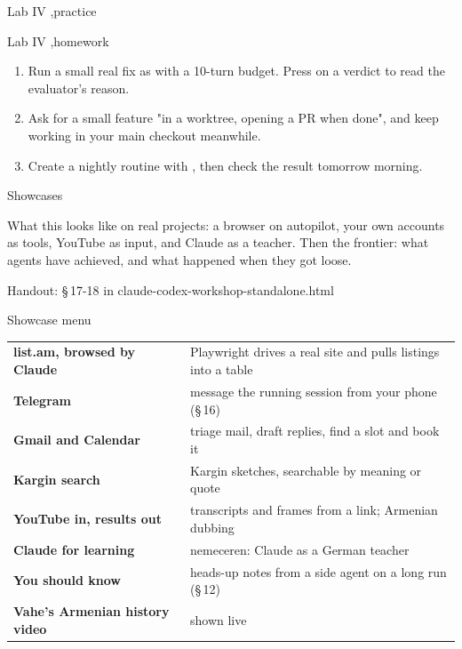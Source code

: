 \documentclass[aspectratio=169,11pt,t]{beamer}
\newcommand{\partframe}[4]{%
  \setsec{}%
  \begin{frame}[c]
    \lbl{Part #1}\par\vspace{0.5em}
    {\seriffamily\fontsize{40}{42}\selectfont #2}\par\vspace{0.8em}
    \begin{minipage}{0.8\textwidth}\raggedright\color{muted}#4\end{minipage}\par\vspace{1.4em}
    {\ttfamily\scriptsize\color{dim}Handout: \S\,#3 in claude-codex-workshop-standalone.html}
  \end{frame}}
\begin{document}
\setsec{}
\begin{frame}{Lab IV \sep practice}
  \begin{lab}{Lab IV \sep homework}
    \begin{enumerate}\setlength\itemsep{0.5em}
      \item Run a small real fix as  with a 10-turn budget. Press  on a verdict to read the evaluator's reason.
      \item Ask for a small feature "in a worktree, opening a PR when done", and keep working in your main checkout meanwhile.
      \item Create a nightly routine with , then check the result tomorrow morning.
    \end{enumerate}
  \end{lab}
\end{frame}

\partframe{V}{Showcases}{17-18}{What this looks like on real projects: a browser on autopilot, your own accounts as tools, YouTube as input, and Claude as a teacher. Then the frontier: what agents have achieved, and what happened when they got loose.}

\begin{frame}{Showcase menu}
  \footnotesize
  \begin{tabularx}{\textwidth}{@{}L{5.2cm}Y@{}}
    \toprule
     & \\
    \midrule
    \textbf{list.am, browsed by Claude} & Playwright drives a real site and pulls listings into a table\\
    \textbf{Telegram} & message the running session from your phone (\S\,16)\\
    \textbf{Gmail and Calendar} & triage mail, draft replies, find a slot and book it\\
    \textbf{Kargin search} & Kargin sketches, searchable by meaning or quote\\
    \textbf{YouTube in, results out} & transcripts and frames from a link; Armenian dubbing\\
    \textbf{Claude for learning} & nemeceren: Claude as a German teacher\\
    \textbf{You should know} & heads-up notes from a side agent on a long run (\S\,12)\\
    \textbf{Vahe's Armenian history video} & shown live\\
    \bottomrule
  \end{tabularx}
\end{frame}
\end{document}
